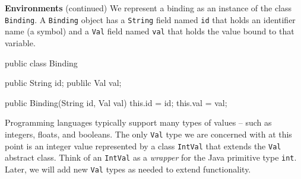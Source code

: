 \begin{minipage}[t]{\sw}
\slidenumber
\LARGE
{\bf Environments} (continued)\exx
We represent a binding as an instance of the class \verb'Binding'.
A \verb'Binding' object has a \verb'String' field named \verb'id'
that holds an identifier name (a symbol)
and a \verb'Val' field named \verb'val'
that holds the value bound to that variable.
\Large
\begin{qv}
public class Binding {

    public String id;
    publilc Val val;

    public Binding(String id, Val val) {
        this.id = id;
        this.val = val;
    }

}
\end{qv}
\LARGE
Programming languages typically support many types of values --
such as integers, floats, and booleans.
The only \verb'Val' type we are concerned with at this point
is an integer value represented by a class \verb'IntVal'
that extends the \verb'Val' abstract class.
Think of an \verb'IntVal' as a {\em wrapper}
for the Java primitive type \verb'int'.
Later, we will add new \verb'Val' types as needed
to extend functionality.\exx
\end{minipage}
\clearpage
